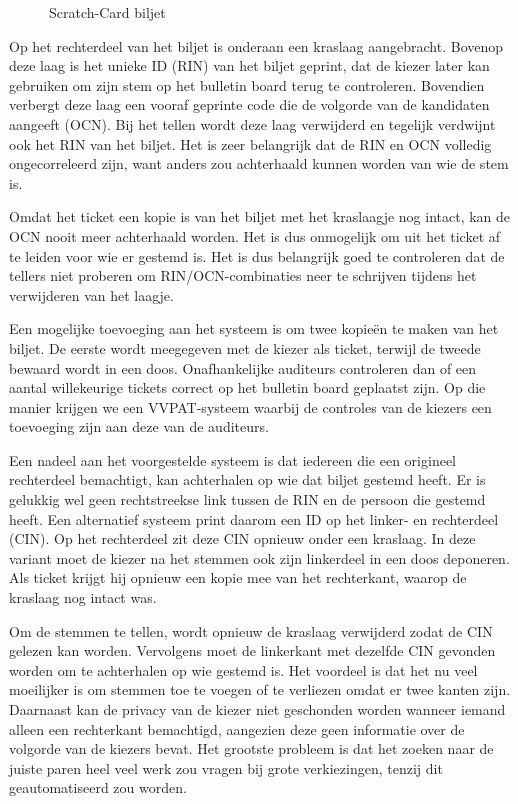 \begin{figure}[H]
	\caption{Scratch-Card biljet\cite{randell_ryan_voting_technologies_and_trust}}
	\label{fig:ls:scratch-card}
\end{figure}

\npar Op het rechterdeel van het biljet is onderaan een kraslaag aangebracht. Bovenop deze laag is het unieke ID (RIN) van het biljet geprint, dat de kiezer later kan gebruiken om zijn stem op het bulletin board terug te controleren. Bovendien verbergt deze laag een vooraf geprinte code die de volgorde van de kandidaten aangeeft (OCN). Bij het tellen wordt deze laag verwijderd en tegelijk verdwijnt ook het RIN van het biljet. Het is zeer belangrijk dat de RIN en OCN volledig ongecorreleerd zijn, want anders zou achterhaald kunnen worden van wie de stem is.

\npar Omdat het ticket een kopie is van het biljet met het kraslaagje nog intact, kan de OCN nooit meer achterhaald worden. Het is dus onmogelijk om uit het ticket af te leiden voor wie er gestemd is. Het is dus belangrijk goed te controleren dat de tellers niet proberen om RIN/OCN-combinaties neer te schrijven tijdens het verwijderen van het laagje.

\npar Een mogelijke toevoeging aan het systeem is om twee kopie\"en te maken van het biljet. De eerste wordt meegegeven met de kiezer als ticket, terwijl de tweede bewaard wordt in een doos. Onafhankelijke auditeurs controleren dan of een aantal willekeurige tickets correct op het bulletin board geplaatst zijn. Op die manier krijgen we een VVPAT-systeem waarbij de controles van de kiezers een toevoeging zijn aan deze van de auditeurs.

\npar Een nadeel aan het voorgestelde systeem is dat iedereen die een origineel rechterdeel bemachtigt, kan achterhalen op wie dat biljet gestemd heeft. Er is gelukkig wel geen rechtstreekse link tussen de RIN en de persoon die gestemd heeft. Een alternatief systeem print daarom een ID op het linker- en rechterdeel (CIN). Op het rechterdeel zit deze CIN opnieuw onder een kraslaag. In deze variant moet de kiezer na het stemmen ook zijn linkerdeel in een doos deponeren. Als ticket krijgt hij opnieuw een kopie mee van het rechterkant, waarop de kraslaag nog intact was.

\npar Om de stemmen te tellen, wordt opnieuw de kraslaag verwijderd zodat de CIN gelezen kan worden. Vervolgens moet de linkerkant met dezelfde CIN gevonden worden om te achterhalen op wie gestemd is. Het voordeel is dat het nu veel moeilijker is om stemmen toe te voegen of te verliezen omdat er twee kanten zijn. Daarnaast kan de privacy van de kiezer niet geschonden worden wanneer iemand alleen een rechterkant bemachtigd, aangezien deze geen informatie over de volgorde van de kiezers bevat. Het grootste probleem is dat het zoeken naar de juiste paren heel veel werk zou vragen bij grote verkiezingen, tenzij dit geautomatiseerd zou worden.

